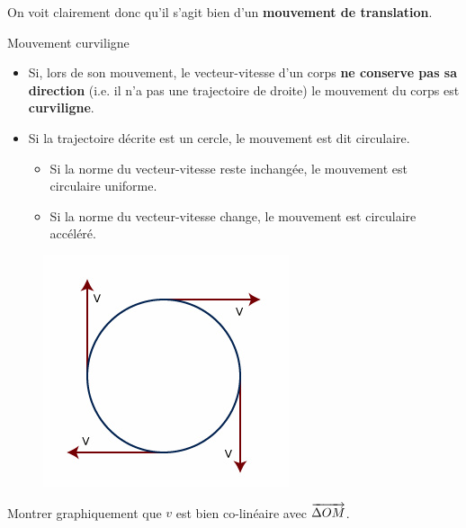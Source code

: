 \documentclass[11pt,a4paper]{article}
\begin{document}
On voit clairement donc qu'il s'agit bien d'un \textbf{mouvement de translation}. 

\begin{defn}{Mouvement curviligne }
\begin{itemize}
    \item Si, lors de son mouvement, le vecteur-vitesse d’un corps \textbf{ne conserve pas sa direction} (i.e. il n’a pas une trajectoire de droite) le mouvement du corps est \textbf{curviligne}.
    \item Si la trajectoire décrite est un cercle, le mouvement est dit circulaire.
    \begin{itemize}
        \item Si la norme du vecteur-vitesse reste inchangée, le mouvement est circulaire uniforme. 
        \item Si la norme du vecteur-vitesse change, le mouvement est circulaire accéléré. 
    \end{itemize}
\end{itemize}
\end{defn}

\begin{exo}

\begin{figure}
    \centering
    \includegraphics[width=.95\linewidth]{imgs/p1/circletang.gif.jpg}
\end{figure}
Montrer graphiquement que $v$ est bien co-linéaire avec $\overrightarrow{\Delta OM} $. 
\vspace{3cm}
\end{exo}
\end{document}

